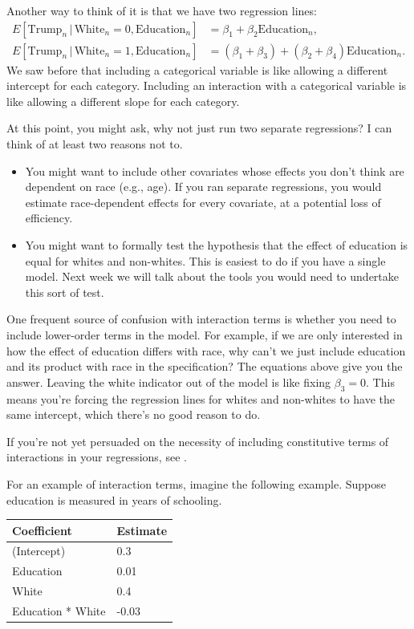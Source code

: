 \documentclass[12pt,oneside,openany]{book}
\begin{document}
Another way to think of it is that we have two regression lines: \[
\begin{aligned}
  E[\text{Trump}_n \,|\, \text{White}_n = 0, \text{Education}_n] &= \beta_1 + \beta_2 \text{Education}_n, \\
  E[\text{Trump}_n \,|\, \text{White}_n = 1, \text{Education}_n] &= (\beta_1 + \beta_3) + (\beta_2 + \beta_4) \text{Education}_n.
\end{aligned}
\] We saw before that including a categorical variable is like allowing
a different intercept for each category. Including an interaction with a
categorical variable is like allowing a different slope for each
category.

At this point, you might ask, why not just run two separate regressions?
I can think of at least two reasons not to.

\begin{itemize}
\item
  You might want to include other covariates whose effects you don't
  think are dependent on race (e.g., age). If you ran separate
  regressions, you would estimate race-dependent effects for every
  covariate, at a potential loss of efficiency.
\item
  You might want to formally test the hypothesis that the effect of
  education is equal for whites and non-whites. This is easiest to do if
  you have a single model. Next week we will talk about the tools you
  would need to undertake this sort of test.
\end{itemize}

One frequent source of confusion with interaction terms is whether you
need to include lower-order terms in the model. For example, if we are
only interested in how the effect of education differs with race, why
can't we just include education and its product with race in the
specification? The equations above give you the answer. Leaving the
white indicator out of the model is like fixing \(\beta_3 = 0\). This
means you're forcing the regression lines for whites and non-whites to
have the same intercept, which there's no good reason to do.

If you're not yet persuaded on the necessity of including constitutive
terms of interactions in your regressions, see
\citet{braumoeller2004hypothesis}.

For an example of interaction terms, imagine the following example.
Suppose education is measured in years of schooling.

\begin{longtable}[]{@{}ll@{}}
\toprule
Coefficient & Estimate\tabularnewline
\midrule
\endhead
(Intercept) & 0.3\tabularnewline
Education & 0.01\tabularnewline
White & 0.4\tabularnewline
Education * White & -0.03\tabularnewline
\bottomrule
\end{longtable}
\end{document}
